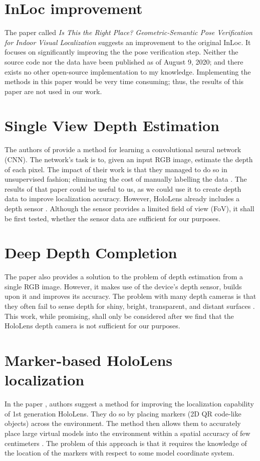 \documentclass[twoside]{ctuthesis}
\theoremstyle{plain}
\theoremstyle{definition}
\theoremstyle{note}
\begin{document}
\section{InLoc improvement}
The paper called \emph{Is This the Right Place? Geometric-Semantic Pose Verification for Indoor Visual Localization} \cite{IsThisTheRightPlace} suggests an improvement to the original InLoc. It focuses on significantly improving the the pose verification step. Neither the source code nor the data have been published as of August 9, 2020; and there exists no other open-source implementation to my knowledge. Implementing the methods in this paper would be very time consuming; thus, the results of this paper are not used in our work.

\section{Single View Depth Estimation}
The authors of \cite{SingleViewDepthEstimation} provide a method for learning a convolutional neural network (CNN). The network's task is to, given an input RGB image, estimate the depth of each pixel. The impact of their work is that they managed to do so in unsupervised fashion; eliminating the cost of manually labelling the data \cite{SingleViewDepthEstimation}. The results of that paper could be useful to us, as we could use it to create depth data to improve localization accuracy. However, HoloLens already includes a depth sensor \cite{HoloLensEvaluation}. Although the sensor provides a limited field of view (FoV), it shall be first tested, whether the sensor data are sufficient for our purposes.

\section{Deep Depth Completion}
The paper \cite{DeepDepthCompletion} also provides a solution to the problem of depth estimation from a single RGB image. However, it makes use of the device's depth sensor, builds upon it and improves its accuracy. The problem with many depth cameras is that they often fail to sense depth for shiny, bright, transparent, and distant surfaces \cite{DeepDepthCompletion}. This work, while promising, shall only be considered after we find that the HoloLens depth camera is not sufficient for our purposes.

\section{Marker-based HoloLens localization}
In the paper \cite{HoloLensMarkerBasedLocalization}, authors suggest a method for improving the localization capability of 1st generation HoloLens. They do so by placing markers (2D QR code-like objects) across the environment. The method then allows them to accurately place large virtual models into the environment within a spatial accuracy of few centimeters \cite{HoloLensMarkerBasedLocalization}. The problem of this approach is that it requires the knowledge of the location of the markers with respect to some model coordinate system.
\end{document}
